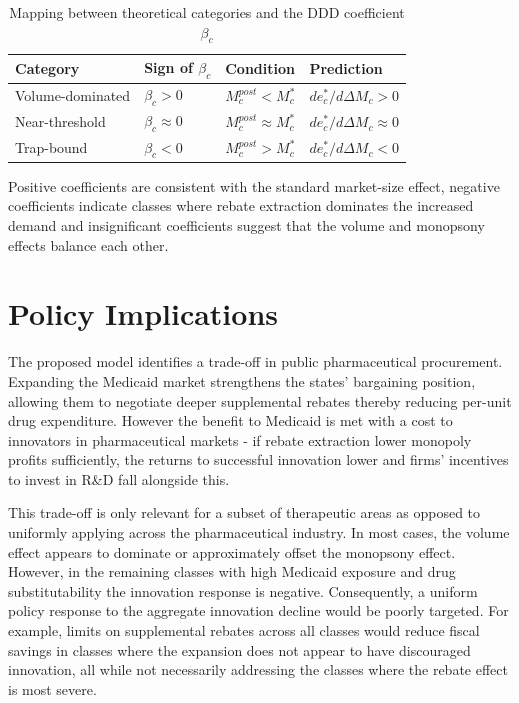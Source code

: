 \documentclass[12pt]{article}
\begin{document}
\begin{table}[h]
\centering
\begin{tabular}{llll}
\hline
\textbf{Category} & \textbf{Sign of $\beta_c$} & \textbf{Condition} & \textbf{Prediction} \\
\hline
Volume-dominated & $\beta_c > 0$ & $M_c^{post} < M_c^*$ & $de_c^*/d\Delta M_c > 0$ \\
Near-threshold   & $\beta_c \approx 0$ & $M_c^{post} \approx M_c^*$ & $de_c^*/d\Delta M_c \approx 0$ \\
Trap-bound       & $\beta_c < 0$ & $M_c^{post} > M_c^*$ & $de_c^*/d\Delta M_c < 0$ \\
\hline
\end{tabular}
\caption{Mapping between theoretical categories and the DDD coefficient $\beta_c$}
\label{tab:regime_mapping}
\end{table}

Positive coefficients are consistent with the standard market-size effect, negative coefficients indicate classes where rebate extraction dominates the increased demand and insignificant coefficients suggest that the volume and monopsony effects balance each other.

\section{Policy Implications}
The proposed model identifies a trade-off in public pharmaceutical procurement. Expanding the Medicaid market strengthens the states' bargaining position, allowing them to negotiate deeper supplemental rebates thereby reducing per-unit drug expenditure. However the benefit to Medicaid is met with a cost to innovators in pharmaceutical markets - if rebate extraction lower monopoly profits sufficiently, the returns to successful innovation lower and firms' incentives to invest in R\&D fall alongside this.

This trade-off is only relevant for a subset of therapeutic areas as opposed to uniformly applying across the pharmaceutical industry. In most cases, the volume effect appears to dominate or approximately offset the monopsony effect. However, in the remaining classes with high Medicaid exposure and drug substitutability the innovation response is negative. Consequently, a uniform policy response to the aggregate innovation decline would be poorly targeted. For example, limits on supplemental rebates across all classes would reduce fiscal savings in classes where the expansion does not appear to have discouraged innovation, all while not necessarily addressing the classes where the rebate effect is most severe.
\end{document}
